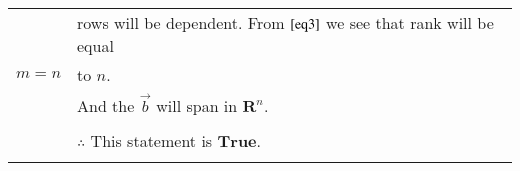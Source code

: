 \documentclass[journal,12pt,twocolumn]{IEEEtran}
\begin{document}
\begin{table}[hp]
\begin{tabular}{|l|l|}
\begin{document}
\begin{table}[hp]
\begin{tabular}{|l|l|}
						implies & rows will be dependent. From $\eqref{eq3}$ we see that rank will be equal \\
						$m=n$ & to $n$.\\
						& And the $\vec{b}$ will span in $\mathbf{R}^{n}$.\\
						& \\
						& $\therefore$ This statement is $\textbf{True}$. \\
						& \\
						\hline
					\end{tabular}
				\end{table}
				
			
\end{document}
